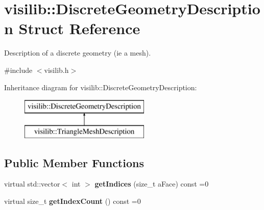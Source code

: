 \hypertarget{structvisilib_1_1_discrete_geometry_description}{}\section{visilib\+::Discrete\+Geometry\+Description Struct Reference}
\label{structvisilib_1_1_discrete_geometry_description}


Description of a discrete geometry (ie a mesh). 




{\ttfamily \#include $<$visilib.\+h$>$}

Inheritance diagram for visilib\+::Discrete\+Geometry\+Description\+:\begin{figure}[H]
\begin{center}
\leavevmode
\includegraphics[height=2.000000cm]{structvisilib_1_1_discrete_geometry_description}
\end{center}
\end{figure}
\subsection*{Public Member Functions}
\begin{DoxyCompactItemize}
\item 
\mbox{\label{structvisilib_1_1_discrete_geometry_description_a69b9b700b3f03b54f919c4b90da51cdf}} 
virtual std\+::vector$<$ int $>$ {\bfseries get\+Indices} (size\+\_\+t a\+Face) const =0
\item 
\mbox{\label{structvisilib_1_1_discrete_geometry_description_a3a41016600ed8cd641fbbee519c17584}} 
virtual size\+\_\+t {\bfseries get\+Index\+Count} () const =0
\end{DoxyCompactItemize}
